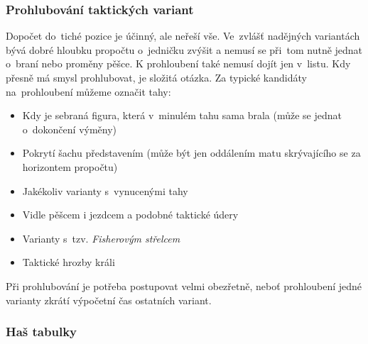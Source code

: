 \documentclass[11pt, titlepage]{article}
\begin{document}
\subsubsection{Prohlubování taktických variant}

Dopočet do~tiché pozice je účinný, ale neřeší vše. Ve~zvlášť nadějných variantách bývá dobré hloubku propočtu o~jedničku zvýšit a nemusí se při~tom nutně jednat o~braní nebo proměny pěšce. K prohloubení také nemusí dojít jen v~listu. Kdy přesně má smysl prohlubovat, je složitá otázka. Za typické kandidáty na~prohloubení můžeme označit tahy:
\begin{itemize}
	\item Kdy je sebraná figura, která v~minulém tahu sama brala (může se jednat o~dokončení výměny)
	\item Pokrytí šachu představením (může být jen oddálením matu skrývajícího se za horizontem propočtu)
	\item Jakékoliv varianty s~vynucenými tahy
	\item Vidle pěšcem i jezdcem a podobné taktické údery
	\item Varianty s~tzv. {\it Fisherovým střelcem}
	\item Taktické hrozby králi
\end{itemize}
Při prohlubování je potřeba postupovat velmi obezřetně, neboť prohloubení jedné varianty zkrátí výpočetní čas ostatních variant.

\subsubsection{Haš tabulky}
\end{document}
